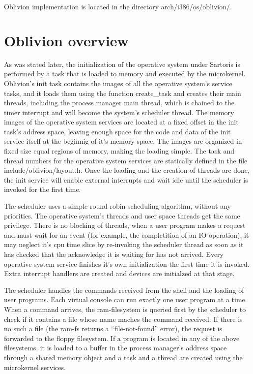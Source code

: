 \documentclass[11pt, letterpaper, twoside, english]{book}
\begin{document}
Oblivion implementation is located in the directory \textsf{arch/i386/os/oblivion/}.

\section{Oblivion overview}

As was stated later, the initialization of the operative system under Sartoris is performed by a task that is loaded to memory and executed by the microkernel. Oblivion's init task contains the images of all the operative system's service tasks, and it loads them using the function \textsf{create\_task} and creates their main threads, including the process manager main thread, which is chained to the timer interrupt and will become the system's scheduler thread. The memory images of the operative system services are located at a fixed offset in the init task's address space, leaving enough space for the code and data of the init service itself at the beginnig of it's memory space. The images are organized in fixed size equal regions of memory, making the loading simple. The task and thread numbers for the operative system services are statically defined in the file \textsf{include/oblivion/layout.h}. Once the loading and the creation of threads are done, the init service will enable external interrupts and wait idle until the scheduler is invoked for the first time.

The scheduler uses a simple round robin scheduling algorithm, without any priorities. The operative system's threads and user space threads get the same privilege. There is no blocking of threads, when a user program makes a request and must wait for an event (for example, the completition of an IO operation), it may neglect it's cpu time slice by re-invoking the scheduler thread as soon as it has checked that the acknowledge it is waiting for has not arrived. Every operative system service finishes it's own initialization the first time it is invoked. Extra interrupt handlers are created and devices are initialzed at that stage.

The scheduler handles the commands received from the shell and the loading of user programs. Each virtual console can run exactly one user program at a time. When a command arrives, the ram-filesystem is queried first by the scheduler to check if it contains a file whose name maches the command received. If there is no such a file (the ram-fs returns a ``file-not-found'' error), the request is forwarded to the floppy filesystem. If a program is located in any of the above filesystems, it is loaded to a buffer in the process manager's address space through a shared memory object and a task and a thread are created using the microkernel services.
\end{document}
